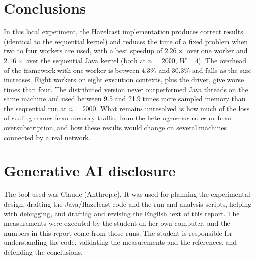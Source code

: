 \documentclass[11pt,a4paper]{article}
\begin{document}
\section{Conclusions}
In this local experiment, the Hazelcast implementation produces correct results (identical to
the sequential kernel) and reduces the time of a fixed problem when two to four workers are
used, with a best speedup of $2.26\times$ over one worker and $2.16\times$ over the sequential
Java kernel (both at $n=2000$, $W=4$). The overhead of the framework with one worker is
between 4.3\% and 30.3\% and falls as the size increases. Eight workers on eight execution
contexts, plus the driver, give worse times than four. The distributed version never
outperformed Java threads on the same machine and used between 9.5 and 21.9 times more
sampled memory than the sequential run at $n=2000$. What remains unresolved is how much of the
loss of scaling comes from memory traffic, from the heterogeneous cores or from oversubscription,
and how these results would change on several machines connected by a real network.

\section{Generative AI disclosure}
The tool used was Claude (Anthropic). It was used for planning the experimental design,
drafting the Java/Hazelcast code and the run and analysis scripts, helping with debugging, and
drafting and revising the English text of this report. The measurements were executed by the
student on her own computer, and the numbers in this report come from those runs. The student
is responsible for understanding the code, validating the measurements and the references, and
defending the conclusions.

\end{document}
